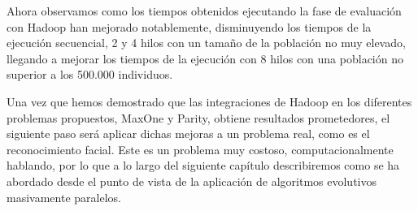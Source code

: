 
Ahora observamos como los tiempos obtenidos ejecutando la fase de evaluación con Hadoop han mejorado notablemente, disminuyendo los tiempos de la ejecución secuencial, 2 y 4 hilos con un tamaño de la población no muy elevado, llegando a mejorar los tiempos de la ejecuci\'on con 8 hilos con una población no superior a los 500.000 individuos.

Una vez que hemos demostrado que las integraciones de Hadoop en los diferentes problemas propuestos, MaxOne y Parity, obtiene resultados prometedores, el siguiente paso será aplicar dichas mejoras a un problema real, como es el reconocimiento facial. Este es un problema muy costoso, computacionalmente hablando, por lo que a lo largo del siguiente cap\'itulo describiremos como se ha abordado desde el punto de vista de la aplicación de algoritmos evolutivos masivamente paralelos.

